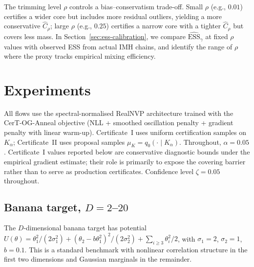 \documentclass[12pt]{article}
\begin{document}
The trimming level $\rho$ controls a bias--conservatism trade-off.
Small $\rho$ (e.g., $0.01$) certifies a wider core but includes more residual outliers, yielding a more conservative $\hat{C}_\rho$;
large $\rho$ (e.g., $0.25$) certifies a narrow core with a tighter $\hat{C}_\rho$ but covers less mass.
In Section~\ref{sec:ess-calibration}, we compare $\widehat{\mathrm{ESS}}_\gamma$ at fixed $\rho$ values with observed ESS from actual IMH chains, and identify the range of $\rho$ where the proxy tracks empirical mixing efficiency.


\section{Experiments}\label{sec:experiments}

All flows use the spectral-normalised RealNVP architecture trained with the CerT-OG-Anneal objective (NLL + smoothed oscillation penalty + gradient penalty with linear warm-up).
Certificate~I uses uniform certification samples on $K_\alpha$; Certificate~II uses proposal samples $\mu_K = q_0(\cdot \mid K_\alpha)$. Throughout, $\alpha = 0.05$.
Certificate~I values reported below are conservative diagnostic bounds under the empirical gradient estimate; their role is primarily to expose the covering barrier rather than to serve as production certificates.
Confidence level $\zeta = 0.05$ throughout.


\subsection{Banana target, $D = 2$--$20$}\label{sec:banana}

The $D$-dimensional banana target has potential $U(\theta) = \theta_1^2/(2\sigma_1^2) + (\theta_2 - b\theta_1^2)^2/(2\sigma_2^2) + \sum_{i \ge 3}\theta_i^2/2$, with $\sigma_1 = 2$, $\sigma_2 = 1$, $b = 0.1$.
This is a standard benchmark with nonlinear correlation structure in the first two dimensions and Gaussian marginals in the remainder.
\end{document}
